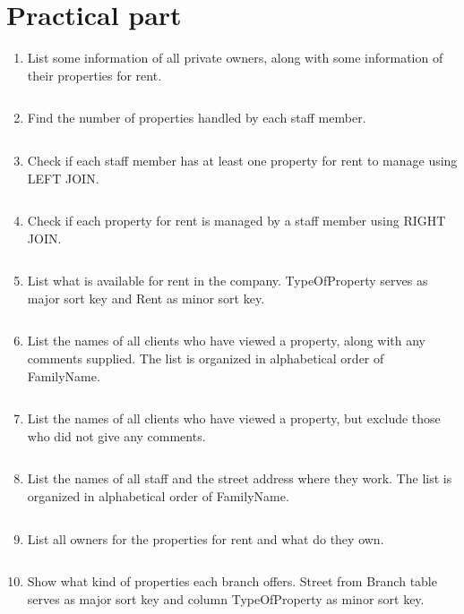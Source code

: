 \documentclass[a4paper]{article}
\begin{document}
    \section{Practical part}
    \begin{enumerate}
    \item List some information of all private owners, along with some information of their properties for rent. \inputminted{sql}{SQLQuery1.sql}
    \item Find the number of properties handled by each staff member. \inputminted{sql}{SQLQuery2.sql}
    \item Check if each staff member has at least one property for rent to manage using LEFT JOIN. \inputminted{sql}{SQLQuery3.sql}
    \item Check if each property for rent is managed by a staff member using RIGHT JOIN. \inputminted{sql}{SQLQuery4.sql}
    \item List what is available for rent in the company. TypeOfProperty serves as major sort key and Rent as minor sort key. \inputminted{sql}{SQLQuery5.sql}
    \item List the names of all clients who have viewed a property, along with any comments supplied. The list is organized in alphabetical order of FamilyName. \inputminted{sql}{SQLQuery6.sql}
    \item List the names of all clients who have viewed a property, but exclude those who did not give any comments.\inputminted{sql}{SQLQuery7.sql}
    \item List the names of all staff and the street address where they work. The list is organized in alphabetical order of FamilyName.\inputminted{sql}{SQLQuery8.sql}
    \item List all owners for the properties for rent and what do they own.\inputminted{sql}{SQLQuery9.sql}
    \item Show what kind of properties each branch offers. Street from Branch table serves as major sort key and column TypeOfProperty as minor sort key.\inputminted{sql}{SQLQuery10.sql}
    \end{enumerate}
    
\end{document}
